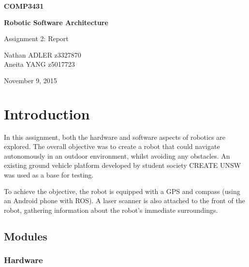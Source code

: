 \documentclass[titlepage,12pt,a4paper]{article}
\begin{document}
\begin{titlepage}
    \begin{center}
        \vspace*{3cm}
        
        \Huge
        \textbf{COMP3431\\}
        \title{}
        \vspace{0.5cm}
        \Huge
        \textbf{Robotic Software Architecture}
        
        \vspace{0.54cm}
        
        \Large
        Assignment 2: Report
        
        \vspace{5cm}

	\large
	Nathan ADLER \hspace*{10pt} z3327870\\
	Aneita YANG \hspace*{24pt} z5017723\\

	\vfill
        
        \Large
        November 9, 2015
        
    \end{center}
\end{titlepage}

\pagebreak
\tableofcontents

\pagebreak
\section{Introduction}
In this assignment, both the hardware and software aspects of robotics are explored. The overall objective was to create a robot that could navigate autonomously in an outdoor environment, whilst avoiding any obstacles. An existing ground vehicle platform developed by student society CREATE UNSW was used as a base for testing.

To achieve the objective, the robot is equipped with a GPS and compass (using an Android phone with ROS). A laser scanner is also attached to the front of the robot, gathering information about the robot's immediate surroundings.

\subsection{Modules}

\subsubsection{Hardware}
\end{document}
